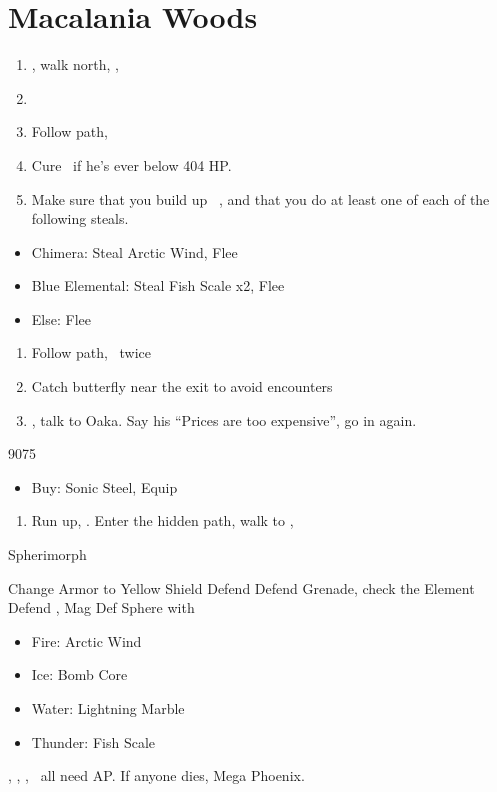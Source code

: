 \chapter{Macalania Woods}

\begin{enumerate}
	\item \sd, walk north, \sd, \save
	\item \formation{\tidus}{\rikku}{\auron}
	\item Follow path, 
	\item Cure \tidus\ if he's ever below 404 HP.
	\item Make sure that you build up \rikku\ \od, and that you do at least one of each of the following steals.
\end{enumerate}
\begin{encounters}
	\begin{itemize}
		\item Chimera: Steal Arctic Wind, Flee
		\item Blue Elemental: Steal Fish Scale x2, Flee
		\item Else: Flee
	\end{itemize}
\end{encounters}
\begin{enumerate}[resume]
	\item Follow path, \sd\ twice
	\item Catch butterfly near the exit to avoid encounters
	      \formation{\tidus}{\yuna}{\kimahri}
	\item \save, talk to Oaka. Say his ``Prices are too expensive'', go in again.
\end{enumerate}
\begin{shop}{9075}
	\begin{itemize}
		\item Buy: Sonic Steel, Equip
	\end{itemize}
\end{shop}
\begin{enumerate}[resume]
	\item Run up, \sd. Enter the hidden path, walk to \auron, \sd
\end{enumerate}
\bothvfill\winvfill\lossvfill
\begin{battle}[12000]{Spherimorph}
	\begin{itemize}
		\tidusf Change Armor to Yellow Shield
		\tidusf Defend
		\yunaf Defend
		\switch{\tidus}{\rikku}
		\rikkuf Grenade, check the Element
		\kimahrif Defend
		\rikkuf \od, Mag Def Sphere with
		\begin{itemize}
			\item Fire: Arctic Wind
			\item Ice: Bomb Core
			\item Water: Lightning Marble
			\item Thunder: Fish Scale
		\end{itemize}
	\end{itemize}
	\tidus, \yuna, \kimahri, \rikku\ all need AP. If anyone dies, Mega Phoenix.
\end{battle}
